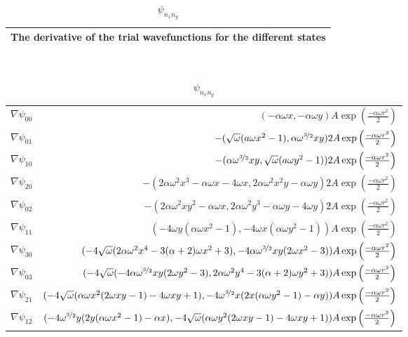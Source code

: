 \begin{table}[H]\caption{$\psi_{n_xn_y}$}\label{tab:derivative_single_particle_trial_wavefunctions}
\begin{tabular}{l}
The derivative of the trial wavefunctions for the different states\\ \hline
\end{tabular}\\
\begin{tabular}{l|r}
\large $\nabla \psi_{00}$ &  $(-\alpha \omega x,-\alpha \omega y) A\exp\left({\frac{-\alpha\omega r^2}{2}}\right)$\\
\large $\nabla \psi_{01}$ &  $-(\sqrt{\omega}(a\omega x^2-1),\alpha \omega^{\nicefrac{3}{2}}xy)2A\exp\left({\frac{-\alpha\omega r^2}{2}}\right)$\\
\large $\nabla \psi_{10}$ &  $-(\alpha \omega^{\nicefrac{3}{2}}xy,\sqrt{\omega}(a\omega y^2-1))2A\exp\left({\frac{-\alpha\omega r^2}{2}}\right)$\\
\large $\nabla \psi_{20}$ &  $-( 2\alpha \omega^2 x^3 - \alpha\omega x-4\omega x,2\alpha\omega^2x^2y-\alpha \omega y)2A\exp\left({\frac{-\alpha\omega r^2}{2}}\right)$\\
\large $\nabla \psi_{02}$ & $-(2\alpha\omega^2xy^2-\alpha \omega x, 2\alpha \omega^2 y^3 - \alpha\omega y-4\omega y)2A\exp\left({\frac{-\alpha\omega r^2}{2}}\right)$\\
\large $\nabla \psi_{11}$ & $(-4\omega y (\alpha \omega x^2 -1),-4\omega x (\alpha \omega y^2 -1))A\exp\left({\frac{-\alpha\omega r^2}{2}}\right)$\\
\large $\nabla \psi_{30}$ &  $(-4 \sqrt{\omega} (2 \alpha \omega^2 x^4 - 3 (\alpha + 2) \omega x^2 + 3),-4 \alpha \omega^{\nicefrac{3}{2}} x y (2 \omega x^2 - 3))A\exp\left({\frac{-\alpha\omega r^2}{2}}\right)$\\
\large $\nabla \psi_{03}$ &  $(-4 \sqrt{\omega} (-4 \alpha \omega^{\nicefrac{3}{2}} x y (2 \omega y^2 - 3),2 \alpha \omega^2 y^4 - 3 (\alpha + 2) \omega y^2 + 3))A\exp\left({\frac{-\alpha\omega r^2}{2}}\right)$\\
\large $\nabla \psi_{21}$ &  $(-4  \sqrt{\omega} (\alpha  \omega x^2 (2  \omega x y - 1) - 4  \omega x y + 1), -4 \omega^{\nicefrac{3}{2}} x (2 x (\alpha  \omega y^2 - 1) - \alpha y))A\exp\left({\frac{-\alpha\omega r^2}{2}}\right)$\\
\large $\nabla \psi_{12}$ &  $(-4 \omega^{\nicefrac{3}{2}} y (2 y (\alpha  \omega x^2 - 1) - \alpha x),-4  \sqrt{\omega} (\alpha  \omega y^2 (2  \omega x y - 1) - 4  \omega x y + 1))A\exp\left({\frac{-\alpha\omega r^2}{2}}\right)$\\
\end{tabular}
\end{table}

